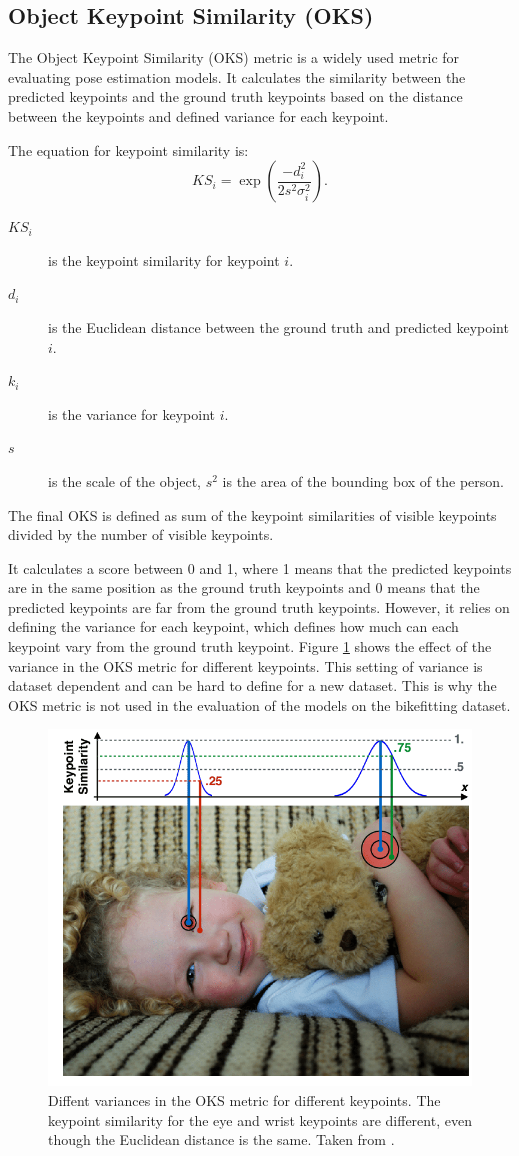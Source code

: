\subsection{Object Keypoint Similarity (OKS)}
The Object Keypoint Similarity (OKS) metric is a widely used metric for evaluating pose estimation models. It calculates the similarity between the predicted keypoints and the ground truth keypoints based on the distance between the keypoints and defined variance for each keypoint.

The equation for keypoint similarity is:
$$KS_i = \exp\left(\frac{-d^2_i}{2s^2\sigma^2_i}\right). $$

\begin{description}
    \item[$KS_i$] is the keypoint similarity for keypoint $i$.
    \item[$d_i$] is the Euclidean distance between the ground truth and predicted keypoint $i$.
    \item[$k_i$] is the variance for keypoint $i$.
    \item[$s$] is the scale of the object, $s^2$ is the area of the bounding box of the person.
\end{description}

The final OKS is defined as sum of the keypoint similarities of visible keypoints divided by the number of visible keypoints.

It calculates a score between 0 and 1, where 1 means that the predicted keypoints are in the same position as the ground truth keypoints and 0 means that the predicted keypoints are far from the ground truth keypoints. However, it relies on defining the variance for each keypoint, which defines how much can each keypoint vary from the ground truth keypoint. Figure \ref{fig:oks} shows the effect of the variance in the OKS metric for different keypoints. This setting of variance is dataset dependent and can be hard to define for a new dataset. This is why the OKS metric is not used in the evaluation of the models on the bikefitting dataset.

\begin{figure}[htbp]
    \centering
    \includegraphics[width=0.7\linewidth]{obrazky-figures/oks.png}
    \caption{Diffent variances in the OKS metric for different keypoints. The keypoint similarity for the eye and wrist keypoints are different, even though the Euclidean distance is the same. Taken from \cite{oks}.}
    \label{fig:oks}
\end{figure}

